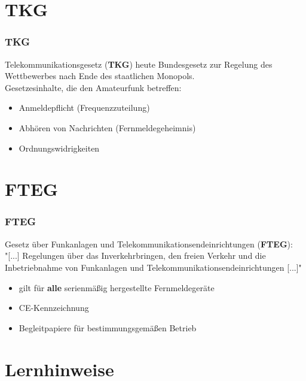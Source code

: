 \section{TKG}

\begin{frame}
    \frametitle{TKG}

    Telekommunikationsgesetz (\textbf{TKG}) heute Bundesgesetz zur Regelung des
    Wettbewerbes nach Ende des staatlichen Monopols. \\[1em]

    Gesetzesinhalte, die den Amateurfunk betreffen:

    \begin{itemize}
        \item Anmeldepflicht (Frequenzzuteilung)
        \item Abhören von Nachrichten (Fernmeldegeheimnis)
        \item Ordnungswidrigkeiten
    \end{itemize}

\end{frame}

\section{FTEG}

\begin{frame}
    \frametitle{FTEG}

     Gesetz über Funkanlagen und Telekommunikationsendeinrichtungen
     (\textbf{FTEG}): \\[2em]
     
     "[...] Regelungen über das Inverkehrbringen, den freien Verkehr
     und die Inbetriebnahme von Funkanlagen und
     Telekommunikationsendeinrichtungen [...]"
    
    \begin{itemize}
        \item gilt für \textbf{alle} serienmäßig hergestellte Fernmeldegeräte
        \item CE-Kennzeichnung
        \item Begleitpapiere für bestimmungsgemäßen Betrieb
    \end{itemize}

\end{frame}

\section{Lernhinweise}

